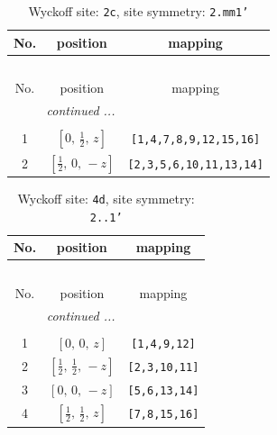\documentclass[fleqn,8pt]{jsarticle}
\begin{document}
\renewcommand{\arraystretch}{1.2}
\begin{longtable}{ccc}
\caption{Wyckoff site: {\tt 2c}, site symmetry: {\tt 2.mm1'}}
 \\
 \hline \hline
No. & position & mapping \\ \hline \endfirsthead

\multicolumn{2}{l}{\tablename\ \thetable{}} \\
 \hline \hline
No. & position & mapping \\ \hline \endhead

 \hline \hline
\multicolumn{2}{r}{\footnotesize\it continued ...} \\ \endfoot

 \hline \hline
\multicolumn{2}{r}{} \\ \endlastfoot

1 & $\left[ 0,\, \frac{1}{2},\, z \right]$ & {\tt [1,4,7,8,9,12,15,16]} \\ \hline
2 & $\left[ \frac{1}{2},\, 0,\, - z \right]$ & {\tt [2,3,5,6,10,11,13,14]} \\
\end{longtable}
\renewcommand{\arraystretch}{1.2}
\begin{longtable}{ccc}
\caption{Wyckoff site: {\tt 4d}, site symmetry: {\tt 2..1'}}
 \\
 \hline \hline
No. & position & mapping \\ \hline \endfirsthead

\multicolumn{2}{l}{\tablename\ \thetable{}} \\
 \hline \hline
No. & position & mapping \\ \hline \endhead

 \hline \hline
\multicolumn{2}{r}{\footnotesize\it continued ...} \\ \endfoot

 \hline \hline
\multicolumn{2}{r}{} \\ \endlastfoot

1 & $\left[ 0,\, 0,\, z \right]$ & {\tt [1,4,9,12]} \\ \hline
2 & $\left[ \frac{1}{2},\, \frac{1}{2},\, - z \right]$ & {\tt [2,3,10,11]} \\ \hline
3 & $\left[ 0,\, 0,\, - z \right]$ & {\tt [5,6,13,14]} \\ \hline
4 & $\left[ \frac{1}{2},\, \frac{1}{2},\, z \right]$ & {\tt [7,8,15,16]} \\
\end{longtable}
\renewcommand{\arraystretch}{1.2}
\end{document}
